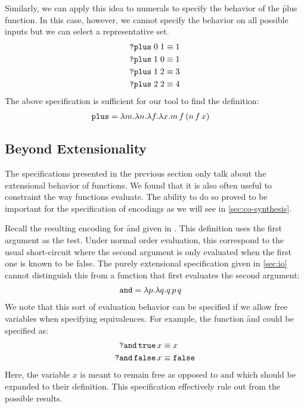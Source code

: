 Similarly, we can apply this idea to numerals to specify the
behavior of the \f{plus} function.
%
In this case, however, we cannot specify the behavior on all
possible inputs but we can select a representative set.
%
\begin{align*}
  \texttt{?plus}\; 0\; 1 &\equiv 1\\
  \texttt{?plus}\; 1\; 0 &\equiv 1\\
  \texttt{?plus}\; 1\; 2 &\equiv 3\\
  \texttt{?plus}\; 2\; 2 &\equiv 4\\
\end{align*}
%
The above specification is sufficient for our tool to find
the definition:
%
\begin{align}
  \label{eq:plus-def}
  \texttt{plus} &= \lambda m. \lambda n. \lambda f. \lambda x. m\,f\,(n\,f\,x)
\end{align}



\subsection{Beyond Extensionality}
%
The specifications presented in the previous section only
talk about the extensional behavior of functions.
%
We found that it is also often useful to constraint the way
functions evaluate.
%
The ability to do so proved to be important for the
specification of encodings as we will see in
\cref{sec:co-synthesis}.

Recall the resulting encoding for \f{and} given in
.
%
This definition uses the first argument as the test.
%
Under normal order evaluation, this correspond to the usual
short-circuit where the second argument is only
evaluated when the first one is known to be false.
%
The purely extensional specification given in \cref{sec:io}
cannot distinguish this from a function that first
evaluates the second argument:
%
\begin{align}
  \label{eq:and-def2}
  \texttt{and} &= \lambda p. \lambda q. q\,p\,q
\end{align}
%
We note that this sort of evaluation behavior can be
specified if we allow free variables when specifying
equivalences.
%
For example, the function \f{and} could be specified as:
%
\begin{align*}
  \texttt{?and}\,\texttt{true}\,x &\equiv x \\
  \texttt{?and}\,\texttt{false}\,x &\equiv \texttt{false} \\
\end{align*}
%
Here, the variable $x$ is meant to remain free as opposed to
\true and \false which should be expanded to their
definition.
%
This specification effectively rule out
 from the possible results.


